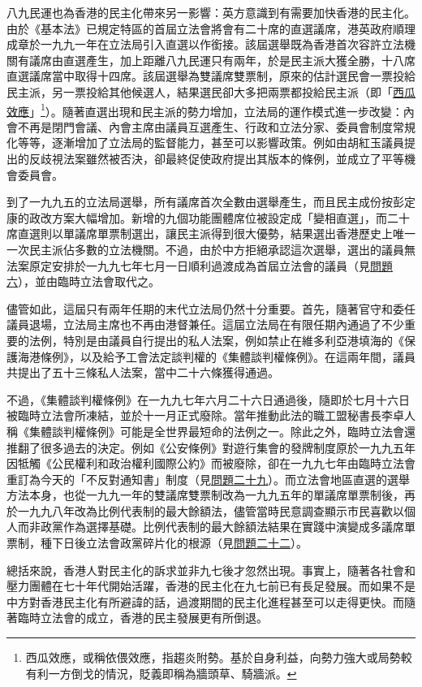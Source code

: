 八九民運也為香港的民主化帶來另一影響：英方意識到有需要加快香港的民主化。由於《基本法》已規定特區的首屆立法會將會有二十席的直選議席，港英政府順理成章於一九九一年在立法局引入直選以作銜接。該屆選舉既為香港首次容許立法機關有議席由直選產生，加上距離八九民運只有兩年，於是民主派大獲全勝，十八席直選議席當中取得十四席。該屆選舉為雙議席雙票制，原來的估計選民會一票投給民主派，另一票投給其他候選人，結果選民卻大多把兩票都投給民主派（即「\href{https://zh.wikipedia.org/zh-hk/%E8%A5%BF%E7%93%9C%E6%95%88%E6%87%89}{西瓜效應}」\footnote{西瓜效應，或稱依偎效應，指趨炎附勢。基於自身利益，向勢力強大或局勢較有利一方倒戈的情況，貶義即稱為牆頭草、騎牆派。}）。隨著直選出現和民主派的勢力增加，立法局的運作模式進一步改變：內會不再是閉門會議、內會主席由議員互選產生、行政和立法分家、委員會制度常規化等等，逐漸增加了立法局的監督能力，甚至可以影響政策。例如由胡紅玉議員提出的反歧視法案雖然被否決，卻最終促使政府提出其版本的條例，並成立了平等機會委員會。

到了一九九五的立法局選舉，所有議席首次全數由選舉產生，而且民主成份按彭定康的政改方案大幅增加。新增的九個功能團體席位被設定成「變相直選」，而二十席直選則以單議席單票制選出，讓民主派得到很大優勢，結果選出香港歷史上唯一一次民主派佔多數的立法機關。不過，由於中方拒絕承認這次選舉，選出的議員無法案原定安排於一九九七年七月一日順利過渡成為首屆立法會的議員（見\hyperref[sec:sec6]{問題六}），並由臨時立法會取代之。

儘管如此，這屆只有兩年任期的末代立法局仍然十分重要。首先，隨著官守和委任議員退場，立法局主席也不再由港督兼任。這屆立法局在有限任期內通過了不少重要的法例，特別是由議員自行提出的私人法案，例如禁止在維多利亞港填海的《保護海港條例》，以及給予工會法定談判權的《集體談判權條例》。在這兩年間，議員共提出了五十三條私人法案，當中二十六條獲得通過。

不過，《集體談判權條例》在一九九七年六月二十六日通過後，隨即於七月十六日被臨時立法會所凍結，並於十一月正式廢除。當年推動此法的職工盟秘書長李卓人稱《集體談判權條例》可能是全世界最短命的法例之一。除此之外，臨時立法會還推翻了很多過去的決定。例如《公安條例》對遊行集會的發牌制度原於一九九五年因牴觸《公民權利和政治權利國際公約》而被廢除，卻在一九九七年由臨時立法會重訂為今天的「不反對通知書」制度（見\hyperref[sec:sec29]{問題二十九}）。而立法會地區直選的選舉方法本身，也從一九九一年的雙議席雙票制改為一九九五年的單議席單票制後，再於一九九八年改為比例代表制的最大餘額法，儘管當時民意調查顯示市民喜歡以個人而非政黨作為選擇基礎。比例代表制的最大餘額法結果在實踐中演變成多議席單票制，種下日後立法會政黨碎片化的根源（見\hyperref[sec:sec22]{問題二十二}）。

總括來說，香港人對民主化的訴求並非九七後才忽然出現。事實上，隨著各社會和壓力團體在七十年代開始活躍，香港的民主化在九七前已有長足發展。而如果不是中方對香港民主化有所避諱的話，過渡期間的民主化進程甚至可以走得更快。而隨著臨時立法會的成立，香港的民主發展更有所倒退。

